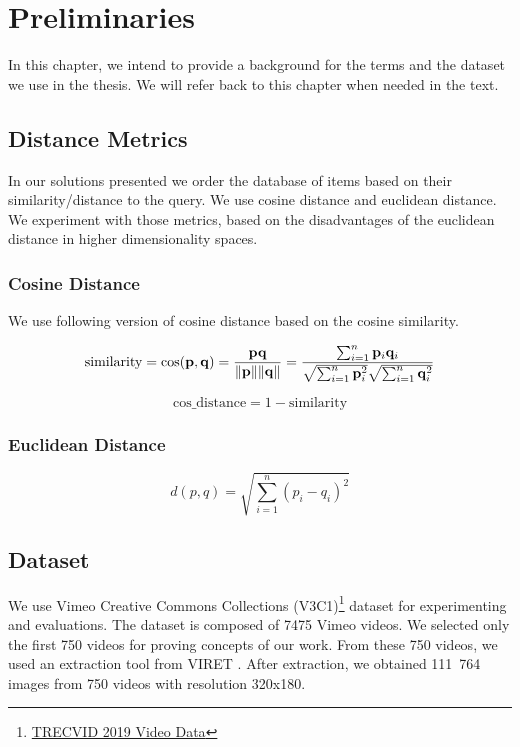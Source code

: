

\chapter{Preliminaries}
\label{ch:preliminaries}

In this chapter, we intend to provide a background for the terms and the dataset we use in the thesis. We will refer back to this chapter when needed in the text. 

\section{Distance Metrics}

In our solutions presented we order the database of items based on their similarity/distance to the query. We use cosine distance and euclidean distance. We experiment with those metrics, based on the disadvantages of the euclidean distance in higher dimensionality spaces.

\subsection{Cosine Distance}

We use following version of cosine distance based on the cosine similarity.

\begin{equation}
\text{similarity} = \cos ({\bf p},{\bf q})= {{\bf p} {\bf q} \over \|{\bf p}\| \|{\bf q}\|} = \frac{ \sum_{i=1}^{n}{{\bf p}_i{\bf q}_i} }{ \sqrt{\sum_{i=1}^{n}{{\bf p}_i^2}} \sqrt{\sum_{i=1}^{n}{{\bf q}_i^2}} }
\end{equation}

\begin{equation}
    \text{cos\_distance} = 1 - \text{similarity}
\end{equation}

\subsection{Euclidean Distance}
\begin{equation}
d(p, q) = \sqrt{\sum_{i=1}^n (p_i - q_i)^2}    
\end{equation}

\section{Dataset}
\label{s:dataset}

We use Vimeo Creative Commons Collections (V3C1)\footnote{\href{https://www-nlpir.nist.gov/projects/tv2019/data.html}{TRECVID 2019 Video Data}} dataset for experimenting and evaluations. The dataset is composed of 7475 Vimeo videos. We selected only the first 750 videos for proving concepts of our work. From these 750 videos, we used an extraction tool from VIRET \cite{lokovc2019framework}. After extraction, we obtained 111\ 764 images from 750 videos with resolution 320x180.

